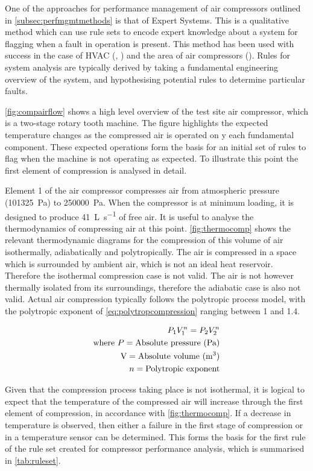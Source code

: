 One of the approaches for performance management of air compressors outlined in \autoref{subsec:perfmgmtmethods} is that of Expert Systems. This is a qualitative method which can use rule sets to encode expert knowledge about a system for flagging when a fault in operation is present. This method has been used with success in the case of HVAC (\cite{Bruton2014}, \cite{House2001}) and the area of air compressors (\cite{Liu2001}). Rules for system analysis are typically derived by taking a fundamental engineering overview of the system, and hypothesising potential rules to determine particular faults.

\autoref{fig:compairflow} shows a high level overview of the test site air compressor, which is a two-stage rotary tooth machine. The figure highlights the expected temperature changes as the compressed air is operated on y each fundamental component. These expected operations form the basis for an initial set of rules to flag when the machine is not operating as expected. To illustrate this point the first element of compression is analysed in detail.

Element 1 of the air compressor compresses air from atmospheric pressure (\SI{101325}{\pascal}) to \SI{250000}{\pascal}. When the compressor is at minimum loading, it is designed to produce \SI{41}{\liter \per \second} of free air. It is useful to analyse the thermodynamics of compressing air at this point. \autoref{fig:thermocomp} shows the relevant thermodynamic diagrams for the compression of this volume of air isothermally, adiabatically and polytropically. The air is compressed in a space which is surrounded by ambient air, which is not an ideal heat reservoir. Therefore the isothermal compression case is not valid. The air is not however thermally isolated from its surroundings, therefore the adiabatic case is also not valid. Actual air compression typically follows the polytropic process model, with the polytropic exponent of \autoref{eq:polytropcompression} ranging between 1 and 1.4.

\begin{eqnarray}
\label{eq:polytropcompression}
P_1 V_1^n = P_2 V_2^n \\
\text{where}~P = \text{Absolute pressure (Pa)} \nonumber \\
\text{V} = \text{Absolute volume (m\textsuperscript{3})} \nonumber \\ 
n = \text{Polytropic exponent} \nonumber
\end{eqnarray} 

Given that the compression process taking place is not isothermal, it is logical to expect that the temperature of the compressed air will increase through the first element of compression, in accordance with \autoref{fig:thermocomp}. If a decrease in temperature is observed, then either a failure in the first stage of compression or in a temperature sensor can be determined. This forms the basis for the first rule of the rule set created for compressor performance analysis, which is summarised in \autoref{tab:ruleset}.

